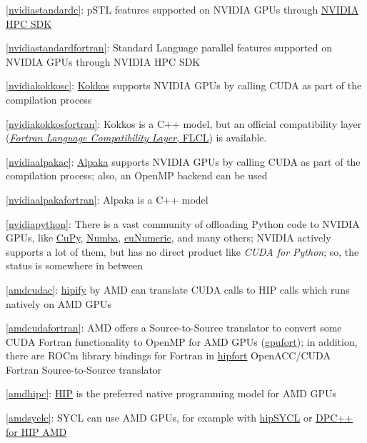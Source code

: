 \item \ref{nvidiastandardc}: pSTL features supported on NVIDIA GPUs through \href{https://docs.nvidia.com/hpc-sdk/compilers/c++-parallel-algorithms/}{NVIDIA HPC SDK}
\item \ref{nvidiastandardfortran}: Standard Language parallel features supported on NVIDIA GPUs through NVIDIA HPC SDK
\item \ref{nvidiakokkosc}: \href{https://github.com/kokkos/kokkos}{Kokkos} supports NVIDIA GPUs by calling CUDA as part of the compilation process
\item \ref{nvidiakokkosfortran}: Kokkos is a C++ model, but an official compatibility layer (\href{https://github.com/kokkos/kokkos-fortran-interop}{\emph{Fortran Language Compatibility Layer}, FLCL}) is available.
\item \ref{nvidiaalpakac}: \href{https://github.com/alpaka-group/alpaka}{Alpaka} supports NVIDIA GPUs by calling CUDA as part of the compilation process; also, an OpenMP backend can be used
\item \ref{nvidiaalpakafortran}: Alpaka is a C++ model
\item \ref{nvidiapython}: There is a vast community of offloading Python code to NVIDIA GPUs, like \href{https://cupy.dev/}{CuPy}, \href{https://numba.pydata.org/}{Numba}, \href{https://developer.nvidia.com/cunumeric}{cuNumeric}, and many others; NVIDIA actively supports a lot of them, but has no direct product like \emph{CUDA for Python}; so, the status is somewhere in between
\item \ref{amdcudac}: \href{https://github.com/ROCm-Developer-Tools/HIPIFY}{hipify} by AMD can translate CUDA calls to HIP calls which runs natively on AMD GPUs
\item \ref{amdcudafortran}: AMD offers a Source-to-Source translator to convert some CUDA Fortran functionality to OpenMP for AMD GPUs (\href{https://github.com/ROCmSoftwarePlatform/gpufort}{gpufort}); in addition, there are ROCm library bindings for Fortran in \href{https://github.com/ROCmSoftwarePlatform/hipfort}{hipfort} OpenACC/CUDA Fortran Source-to-Source translator
\item \ref{amdhipc}: \href{https://github.com/ROCm-Developer-Tools/HIP}{HIP} is the preferred native programming model for AMD GPUs
\item \ref{amdsyclc}: SYCL can use AMD GPUs, for example with \href{https://github.com/illuhad/hipSYCL}{hipSYCL} or \href{https://github.com/intel/llvm/blob/sycl/sycl/doc/GetStartedGuide.md\#build-dpc-toolchain-with-support-for-hip-amd}{DPC++ for HIP AMD}
